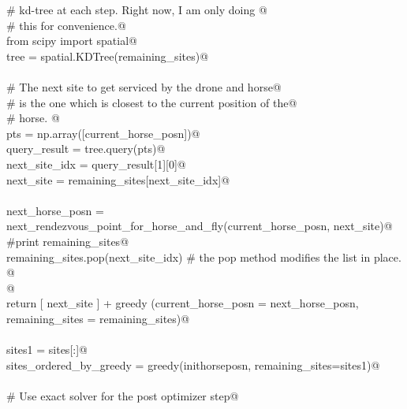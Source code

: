 \documentclass[11.5pt]{report}
\begin{document}
\begin{flushleft}
\begin{list}{}{}
\mbox{}\verb@                  # kd-tree at each step. Right now, I am only doing @\\
\mbox{}\verb@                  # this for convenience.@\\
\mbox{}\verb@                  from scipy import spatial@\\
\mbox{}\verb@                  tree = spatial.KDTree(remaining_sites)@\\
\mbox{}\verb@@\\
\mbox{}\verb@                  # The next site to get serviced by the drone and horse@\\
\mbox{}\verb@                  # is the one which is closest to the current position of the@\\
\mbox{}\verb@                  # horse. @\\
\mbox{}\verb@                  pts           = np.array([current_horse_posn])@\\
\mbox{}\verb@                  query_result  = tree.query(pts)@\\
\mbox{}\verb@                  next_site_idx = query_result[1][0]@\\
\mbox{}\verb@                  next_site     = remaining_sites[next_site_idx]@\\
\mbox{}\verb@@\\
\mbox{}\verb@                  next_horse_posn = \@\\
\mbox{}\verb@                        next_rendezvous_point_for_horse_and_fly(current_horse_posn, next_site)@\\
\mbox{}\verb@                  #print remaining_sites@\\
\mbox{}\verb@                  remaining_sites.pop(next_site_idx) # the pop method modifies the list in place. @\\
\mbox{}\verb@                  @\\
\mbox{}\verb@                  return [ next_site ] + greedy (current_horse_posn = next_horse_posn, \@\\
\mbox{}\verb@                                                 remaining_sites    = remaining_sites)@\\
\mbox{}\verb@@\\
\mbox{}\verb@      sites1 = sites[:]@\\
\mbox{}\verb@      sites_ordered_by_greedy = greedy(inithorseposn, remaining_sites=sites1)@\\
\mbox{}\verb@@\\
\mbox{}\verb@      # Use exact solver for the post optimizer step@\\

\end{list}
\end{flushleft}
\end{document}
